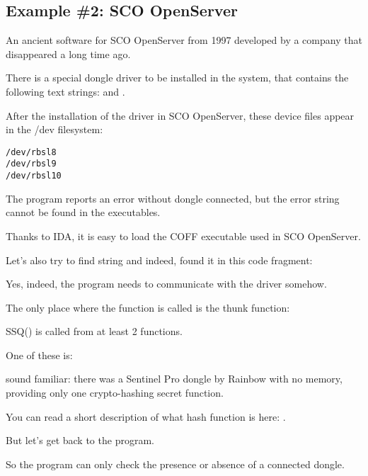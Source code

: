\subsection{Example \#2: SCO OpenServer}

\label{examples_SCO}
An ancient software for SCO OpenServer from 1997 
developed
by a company that disappeared a long time ago.


There is a special dongle driver to be installed in the system, that contains the following text strings:
and
.

After the installation of the driver in SCO OpenServer, these device files appear in the /dev filesystem:

\begin{lstlisting}
/dev/rbsl8
/dev/rbsl9
/dev/rbsl10
\end{lstlisting}


The program reports an error without dongle connected, but the error string cannot be found in the executables.


Thanks to \ac{IDA}, it is easy to load the COFF executable used in SCO OpenServer.

%
Let's also try to find  string and indeed, found it in this code fragment:




Yes, indeed, the program needs to communicate with the driver somehow.

The only place where the 
function is called is the \gls{thunk function}:



SSQ() 
is called from at least 2 functions.

One of these is:



 \AndENRU {} 
sound familiar: there was a Sentinel Pro dongle by Rainbow with no memory,
providing only one crypto-hashing secret function.

You can read a short description
of what hash function is here: .

But let's get back to the program.

So the program can only check the presence or absence of a connected dongle.

